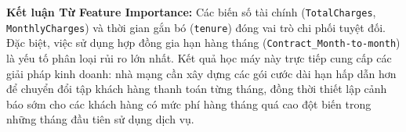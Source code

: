 \textbf{Kết luận Từ Feature Importance:}
Các biến số tài chính (\texttt{TotalCharges}, \texttt{MonthlyCharges}) và thời gian gắn bó (\texttt{tenure}) đóng vai trò chi phối tuyệt đối. Đặc biệt, việc sử dụng hợp đồng gia hạn hàng tháng (\texttt{Contract\_Month-to-month}) là yếu tố phân loại rủi ro lớn nhất. Kết quả học máy này trực tiếp cung cấp các giải pháp kinh doanh: nhà mạng cần xây dựng các gói cước dài hạn hấp dẫn hơn để chuyển đổi tập khách hàng thanh toán từng tháng, đồng thời thiết lập cảnh báo sớm cho các khách hàng có mức phí hàng tháng quá cao đột biến trong những tháng đầu tiên sử dụng dịch vụ.

